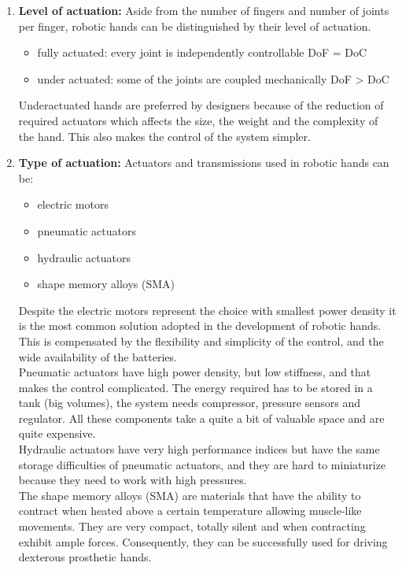 \documentclass[a4paper, 10pt, conference]{ieeeconf}      %
\begin{document}
\begin{enumerate}
  \item \textbf{Level of actuation:}
Aside from the number of fingers and number of joints per finger, robotic hands can be distinguished by their level of actuation.\\
 	\begin{itemize}
 		\item fully actuated: every joint is independently controllable DoF = DoC
 		\item under actuated: some of the joints are coupled mechanically DoF > DoC\\
 	\end{itemize}
Underactuated hands are preferred by designers because of the reduction of required actuators which affects the size, the weight and the complexity of the hand. This also makes the control of the system simpler.\\
  \item \textbf{Type of actuation:}
Actuators and transmissions used in robotic hands can be:\\
	\begin{itemize}
		\item electric motors
		\item pneumatic actuators
		\item hydraulic actuators
		\item shape memory alloys (SMA)\\
	\end{itemize}
Despite the electric motors represent the choice with smallest power density it is the most common solution adopted in the development of robotic hands. This is compensated by the flexibility and simplicity of the control, and the wide availability of the batteries.\\
Pneumatic actuators have high power density, but low stiffness, and that makes the control complicated. The energy required has to be stored in a tank (big volumes), the system needs compressor, pressure sensors and regulator. All these components take a quite a bit of valuable space and are quite expensive.\\
Hydraulic actuators have very high performance indices but have the same storage difficulties of pneumatic actuators, and they are hard to miniaturize because they need to work with high pressures.\\
The shape memory alloys (SMA) are materials that have the ability to contract when heated above a certain temperature allowing muscle-like movements. They are very compact, totally silent and when contracting exhibit ample forces. Consequently, they can be successfully used for driving dexterous prosthetic hands.\\

\end{enumerate}
\end{document}
